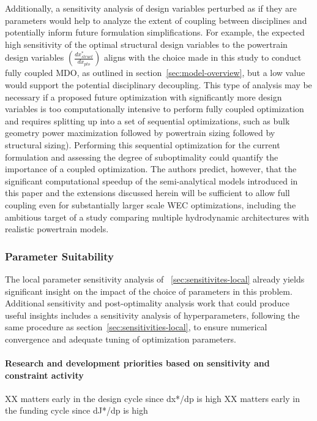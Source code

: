 Additionally, a sensitivity analysis of design variables perturbed as if they are parameters would help to analyze the extent of coupling between disciplines and potentially inform future formulation simplifications. For example, the expected high sensitivity of the optimal structural design variables to the powertrain design variables $\left(\frac{dx^*_{struct}}{dx_{pto}}\right)$ aligns with the choice made in this study to conduct fully coupled MDO, as outlined in section~\ref{sec:model-overview}, but a low value would support the potential disciplinary decoupling. This type of analysis may be necessary if a proposed future optimization with significantly more design variables is too computationally intensive to perform fully coupled optimization and requires splitting up into a set of sequential optimizations, such as bulk geometry power maximization followed by powertrain sizing followed by structural sizing). Performing this sequential optimization for the current formulation and assessing the degree of suboptimality could quantify the importance of a coupled optimization. The authors predict, however, that the significant computational speedup of the semi-analytical models introduced in this paper and the extensions discussed herein will be sufficient to allow full coupling even for substantially larger scale WEC optimizations, including the ambitious target of a study comparing multiple hydrodynamic architectures with realistic powertrain models.

\subsubsection{Parameter Suitability}
The local parameter sensitivity analysis of \sectionautorefname~\ref{sec:sensitivites-local} already yields significant insight on the impact of the choice of parameters in this problem. Additional sensitivity and post-optimality analysis work that could produce useful insights includes a sensitivity analysis of hyperparameters, following the same procedure as section~\ref{sec:sensitivities-local}, to ensure numerical convergence and adequate tuning of optimization parameters.

\paragraph{Research and development priorities based on sensitivity and constraint activity}
XX matters early in the design cycle since dx*/dp is high
XX matters early in the funding cycle since dJ*/dp is high

